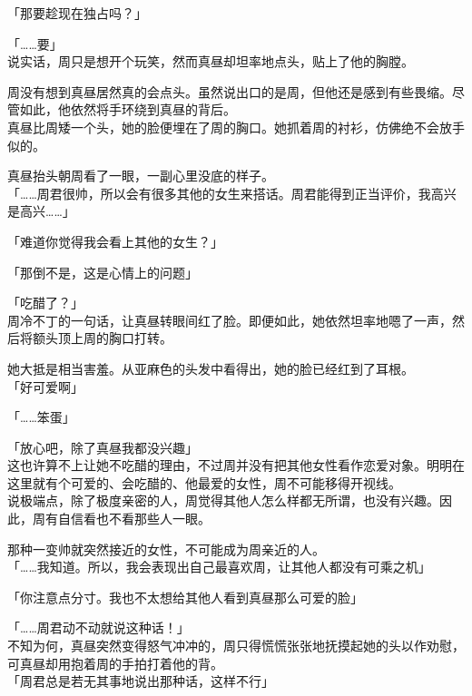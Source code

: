 「那要趁现在独占吗？」

「……要」\\

说实话，周只是想开个玩笑，然而真昼却坦率地点头，贴上了他的胸膛。

周没有想到真昼居然真的会点头。虽然说出口的是周，但他还是感到有些畏缩。尽管如此，他依然将手环绕到真昼的背后。\\

真昼比周矮一个头，她的脸便埋在了周的胸口。她抓着周的衬衫，仿佛绝不会放手似的。

真昼抬头朝周看了一眼，一副心里没底的样子。\\

「……周君很帅，所以会有很多其他的女生来搭话。周君能得到正当评价，我高兴是高兴……」

「难道你觉得我会看上其他的女生？」

「那倒不是，这是心情上的问题」

「吃醋了？」\\

周冷不丁的一句话，让真昼转眼间红了脸。即便如此，她依然坦率地嗯了一声，然后将额头顶上周的胸口打转。

她大抵是相当害羞。从亚麻色的头发中看得出，她的脸已经红到了耳根。\\

「好可爱啊」

「……笨蛋」

「放心吧，除了真昼我都没兴趣」\\

这也许算不上让她不吃醋的理由，不过周并没有把其他女性看作恋爱对象。明明在这里就有个可爱的、会吃醋的、他最爱的女性，周不可能移得开视线。\\

说极端点，除了极度亲密的人，周觉得其他人怎么样都无所谓，也没有兴趣。因此，周有自信看也不看那些人一眼。

那种一变帅就突然接近的女性，不可能成为周亲近的人。\\

「……我知道。所以，我会表现出自己最喜欢周，让其他人都没有可乘之机」

「你注意点分寸。我也不太想给其他人看到真昼那么可爱的脸」

「……周君动不动就说这种话！」\\

不知为何，真昼突然变得怒气冲冲的，周只得慌慌张张地抚摸起她的头以作劝慰，可真昼却用抱着周的手拍打着他的背。\\

「周君总是若无其事地说出那种话，这样不行」

